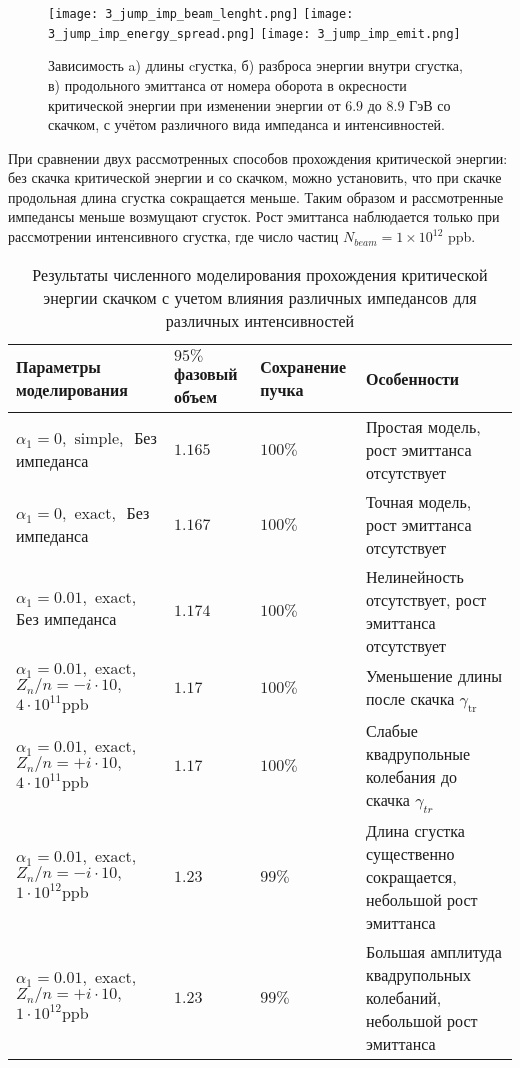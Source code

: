 \begin{figure}
   \texttt{[image: 3\_jump\_imp\_beam\_lenght.png]}
   \texttt{[image: 3\_jump\_imp\_energy\_spread.png]}
   \texttt{[image: 3\_jump\_imp\_emit.png]}
   \caption{Зависимость a) длины cгустка, б) разброса энергии внутри сгустка, в) продольного эмиттанса от номера оборота в окресности критической энергии при изменении энергии от $6.9$ до $8.9$ ГэВ со скачком, с учётом различного вида импеданса и интенсивностей.}
   \label{fig:3_jump_imp}
\end{figure}

\par При сравнении двух рассмотренных способов прохождения критической энергии: без скачка критической энергии и со скачком, можно установить, что при скачке продольная длина сгустка сокращается меньше. Таким образом и рассмотренные импедансы меньше возмущают сгусток. Рост эмиттанса наблюдается только при рассмотрении интенсивного сгустка, где число частиц $N_{beam}=1\times{10}^{12}$ ppb.

\begin{table}
\begin{center}
\begin{tabular}{| m{4cm} | M{2.5cm} | M{2.5cm} | m{6.6cm} |}
\hline 
Параметры моделирования & $95 \%$ фазовый объем & Сохранение пучка & Особенности \\
\hline
$ \alpha_1=0, \text { simple, } $ Без импеданса
 & $1.165$ & $100\%$ &
Простая модель, рост эмиттанса отсутствует \\
\hline
$ \alpha_1=0, \text { exact, } $ Без импеданса
 & $1.167$ & $100\%$ & 
Точная модель, рост эмиттанса отсутствует  \\
\hline
$ \alpha_1=0.01, \text { exact, }$ Без импеданса
 & $1.174$ & $100\%$ & Нелинейность отсутствует, рост эмиттанса отсутствует \\
\hline 
$ \alpha_1=0.01, \text { exact, } $
$ Z_n / n=-i \cdot 10, \quad $
$ 4 \cdot 10^{11} \mathrm{ppb} $
 & $1.17$ & $100\%$ & Уменьшение длины после скачка $\gamma_{\text {tr }}$ \\
\hline 
$ \alpha_1=0.01, \text { exact, } $
$ Z_n / n=+i \cdot 10, \quad $
$ 4 \cdot 10^{11} \mathrm{ppb} $
 & $1.17$ & $100\%$ & Слабые квадрупольные колебания до скачка $\gamma_{t r}$ \\
\hline
$ \alpha_1=0.01, \text { exact, } $
$ Z_n / n=-i \cdot 10, \quad$
$ 1 \cdot 10^{12} \mathrm{ppb} $
 & $1.23$ & $99\%$ & Длина сгустка существенно сокращается, небольшой рост эмиттанса \\
\hline
$ \alpha_1=0.01, \text { exact, } $
$ Z_n / n=+i \cdot 10, \quad$
$ 1 \cdot 10^{12} \mathrm{ppb} $
 & $1.23$ & $99\%$ & Большая амплитуда квадрупольных колебаний, небольшой рост эмиттанса \\
\hline
\end{tabular}
\end{center}
\caption{Результаты численного моделирования прохождения критической энергии скачком с учетом влияния различных импедансов для различных интенсивностей}
\end{table}

